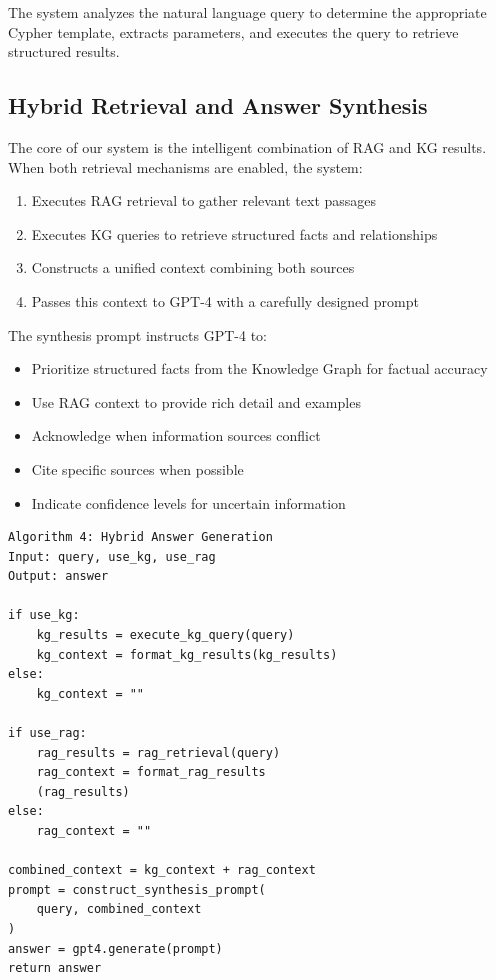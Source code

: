 \documentclass[11pt,twocolumn]{article}
\begin{document}
The system analyzes the natural language query to determine the appropriate Cypher template, extracts parameters, and executes the query to retrieve structured results.

\subsection{Hybrid Retrieval and Answer Synthesis}

The core of our system is the intelligent combination of RAG and KG results. When both retrieval mechanisms are enabled, the system:

\begin{enumerate}
\item Executes RAG retrieval to gather relevant text passages
\item Executes KG queries to retrieve structured facts and relationships
\item Constructs a unified context combining both sources
\item Passes this context to GPT-4 with a carefully designed prompt
\end{enumerate}

The synthesis prompt instructs GPT-4 to:
\begin{itemize}
\item Prioritize structured facts from the Knowledge Graph for factual accuracy
\item Use RAG context to provide rich detail and examples
\item Acknowledge when information sources conflict
\item Cite specific sources when possible
\item Indicate confidence levels for uncertain information
\end{itemize}

\begin{verbatim}
Algorithm 4: Hybrid Answer Generation
Input: query, use_kg, use_rag
Output: answer

if use_kg:
    kg_results = execute_kg_query(query)
    kg_context = format_kg_results(kg_results)
else:
    kg_context = ""

if use_rag:
    rag_results = rag_retrieval(query)
    rag_context = format_rag_results
    (rag_results)
else:
    rag_context = ""

combined_context = kg_context + rag_context
prompt = construct_synthesis_prompt(
    query, combined_context
)
answer = gpt4.generate(prompt)
return answer
\end{verbatim}
\end{document}
